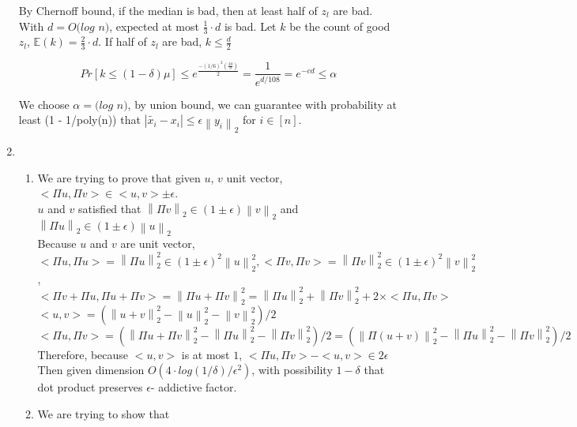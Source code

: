 \documentclass[11pt]{article}%
\newcommand{\norm}[1]{\left\lVert#1\right\rVert}
\begin{document}
\begin{questions}[1]
\begin{enumerate}
    By Chernoff bound, if the median is bad, then at least half of $z_l$ are bad. With $d = O(log$ $n)$, expected at most $\frac{1}{3}\cdot d$ is bad. Let $k$ be the count of good $z_l$, $\mathbb{E}(k) = \frac{2}{3} \cdot d$. If half of $z_l$ are bad, $k \leq \frac{d}{2}$
    
    $$ Pr[k \leq (1 - \delta)\mu] \leq e^{\frac{-(1/6)^2(\frac{2d}{3})}{2}} = \frac{1}{e^{d/108}} = e^{-cd} \leq \alpha$$
    
    We choose $\alpha = (log$ $n)$, by union bound, we can guarantee with probability at least (1 - 1/poly(n)) that $|\tilde{x_i} - x_i| \leq \epsilon\norm{y_i}_2$ for $i \in [n]$.
    \newpage
    \item 
        \begin{enumerate}
            \item 
                We are trying to prove that given $u$, $v$ unit vector, $<\Pi u, \Pi v> \in <u, v> \pm\epsilon$. \\
                
                $u$ and $v$ satisfied that $\norm{\Pi v}_2 \in (1\pm\epsilon)\norm{v}_2$ and $\norm{\Pi u}_2 \in (1\pm\epsilon)\norm{u}_2$  \\
                
                Because $u$ and $v$ are unit vector, $<\Pi u, \Pi u> = \norm{\Pi u}_2^2 \in (1\pm\epsilon)^2\norm{u}_2^2 ,<\Pi v, \Pi v> = \norm{\Pi v}_2^2 \in (1\pm\epsilon)^2\norm{v}_2^2 $, $<\Pi v + \Pi u, \Pi u + \Pi v> = \norm{\Pi u + \Pi v}_2^2 = \norm{\Pi u}_2^2 + \norm{\Pi v}_2^2 + 2 \times <\Pi u,\Pi v>$ \\
    
                $<u,v> = (\norm{u+v}_2^2 - \norm{u}_2^2 - \norm{v}_2^2)/2$\\
                $<\Pi u, \Pi v> = (\norm{\Pi u + \Pi v}_2^2 - \norm{\Pi u}_2^2 - \norm{\Pi v}_2^2)/2 = (\norm{\Pi (u + v)}_2^2 - \norm{\Pi u}_2^2 - \norm{\Pi v}_2^2)/2$\\
                
                Therefore, because $<u,v>$ is at most $1$, $<\Pi u, \Pi v> - <u,v> \in 2\epsilon$ \\
                
                Then given dimension $O(4\cdot log(1/\delta)/\epsilon^2)$, with possibility $1-\delta$ that dot product preserves $\epsilon$- addictive factor. 

            \item 
                We are trying to show that 
            

\end{enumerate}
\end{enumerate}
\end{questions}
\end{document}
